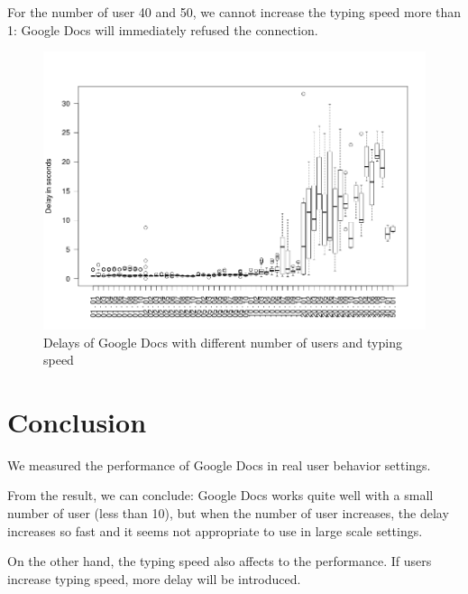 \documentclass[a4paper,12pt]{article}
\begin{document}
For the number of user 40 and 50, we cannot increase the typing speed more than 1: Google Docs will immediately refused the connection.

\begin{figure}
		\includegraphics[width=\textwidth]{GoogleDocs}	
		\caption{Delays of Google Docs with different number of users and typing speed}
		\label{fig:google_docs1}
	\end{figure}
	
\section{Conclusion}
We measured the performance of Google Docs in real user behavior settings.

From the result, we can conclude: Google Docs works quite well with a small number of user (less than 10), but when the number of user increases, the delay increases so fast and it seems not appropriate to use in large scale settings.

On the other hand, the typing speed also affects to the performance. If users increase typing speed, more delay will be introduced.
	
\end{document}
